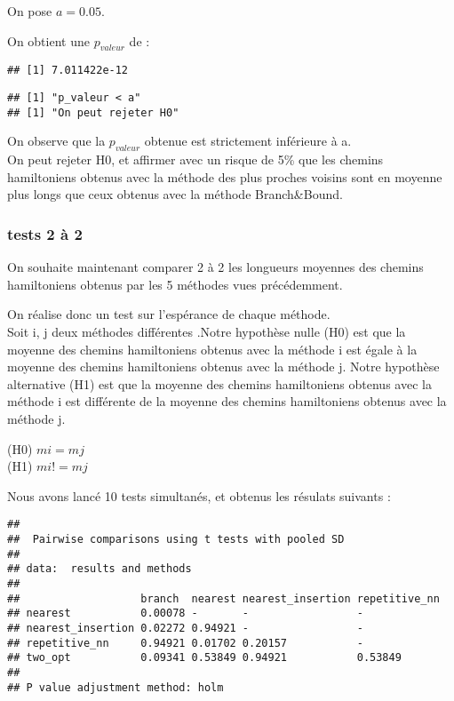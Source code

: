 \documentclass[
]{article}
\begin{document}
On pose \(a=0.05\).

On obtient une \(p_{valeur}\) de :

\begin{verbatim}
## [1] 7.011422e-12
\end{verbatim}

\begin{verbatim}
## [1] "p_valeur < a"
## [1] "On peut rejeter H0"
\end{verbatim}

On observe que la \(p_{valeur}\) obtenue est strictement inférieure à
a.\\
On peut rejeter H0, et affirmer avec un risque de 5\% que les chemins
hamiltoniens obtenus avec la méthode des plus proches voisins sont en
moyenne plus longs que ceux obtenus avec la méthode Branch\&Bound.

\hypertarget{tests-2-uxe0-2}{%
\subsubsection{tests 2 à 2}\label{tests-2-uxe0-2}}

On souhaite maintenant comparer 2 à 2 les longueurs moyennes des chemins
hamiltoniens obtenus par les 5 méthodes vues précédemment.

On réalise donc un test sur l'espérance de chaque méthode.\\
Soit i, j deux méthodes différentes .Notre hypothèse nulle (H0) est que
la moyenne des chemins hamiltoniens obtenus avec la méthode i est égale
à la moyenne des chemins hamiltoniens obtenus avec la méthode j. Notre
hypothèse alternative (H1) est que la moyenne des chemins hamiltoniens
obtenus avec la méthode i est différente de la moyenne des chemins
hamiltoniens obtenus avec la méthode j.

(H0) \(mi=mj\)\\
(H1) \(mi!=mj\)

Nous avons lancé 10 tests simultanés, et obtenus les résulats suivants :

\begin{verbatim}
## 
##  Pairwise comparisons using t tests with pooled SD 
## 
## data:  results and methods 
## 
##                   branch  nearest nearest_insertion repetitive_nn
## nearest           0.00078 -       -                 -            
## nearest_insertion 0.02272 0.94921 -                 -            
## repetitive_nn     0.94921 0.01702 0.20157           -            
## two_opt           0.09341 0.53849 0.94921           0.53849      
## 
## P value adjustment method: holm
\end{verbatim}
\end{document}

